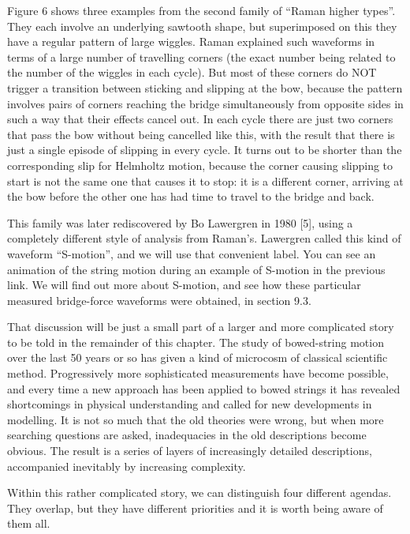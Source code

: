   Figure 6 shows three examples from the second family of “Raman higher types”. 
  They each involve an underlying sawtooth shape, but superimposed on this they 
  have a regular pattern of large wiggles. Raman explained such waveforms in 
  terms of a large number of travelling corners (the exact number being related 
  to the number of the wiggles in each cycle). But most of these corners do NOT 
  trigger a transition between sticking and slipping at the bow, because the 
  pattern involves pairs of corners reaching the bridge simultaneously from 
  opposite sides in such a way that their effects cancel out. In each cycle 
  there are just two corners that pass the bow without being cancelled like 
  this, with the result that there is just a single episode of slipping in 
  every cycle. It turns out to be shorter than the corresponding slip for 
  Helmholtz motion, because the corner causing slipping to start is not the 
  same one that causes it to stop: it is a different corner, arriving at the 
  bow before the other one has had time to travel to the bridge and back. 

  This family was later rediscovered by Bo Lawergren in 1980 [5], using a 
  completely different style of analysis from Raman’s. Lawergren called this 
  kind of waveform “S-motion”, and we will use that convenient label. You can 
  see an animation of the string motion during an example of S-motion in the 
  previous link. We will find out more about S-motion, and see how these 
  particular measured bridge-force waveforms were obtained, in section 9.3. 

  That discussion will be just a small part of a larger and more complicated 
  story to be told in the remainder of this chapter. The study of bowed-string 
  motion over the last 50 years or so has given a kind of microcosm of 
  classical scientific method. Progressively more sophisticated measurements 
  have become possible, and every time a new approach has been applied to bowed 
  strings it has revealed shortcomings in physical understanding and called for 
  new developments in modelling. It is not so much that the old theories were 
  wrong, but when more searching questions are asked, inadequacies in the old 
  descriptions become obvious. The result is a series of layers of increasingly 
  detailed descriptions, accompanied inevitably by increasing complexity. 

  Within this rather complicated story, we can distinguish four different 
  agendas. They overlap, but they have different priorities and it is worth 
  being aware of them all. 

